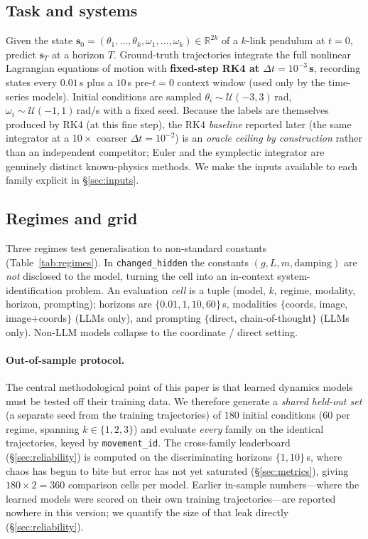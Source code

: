 \documentclass{article}
\begin{document}
\subsection{Task and systems}
Given the state $\mathbf{s}_0=(\theta_1,\dots,\theta_k,\omega_1,\dots,\omega_k)\in
\mathbb{R}^{2k}$ of a $k$-link pendulum at $t{=}0$, predict $\mathbf{s}_T$ at a
horizon $T$. Ground-truth trajectories integrate the full nonlinear Lagrangian
equations of motion with \textbf{fixed-step RK4 at $\Delta t{=}10^{-3}$\,s}, recording
states every $0.01$\,s plus a $10$\,s pre-$t{=}0$ context window (used only by the
time-series models). Initial conditions are sampled $\theta_i\sim\mathcal{U}(-3,3)$\,rad,
$\omega_i\sim\mathcal{U}(-1,1)$\,rad/s with a fixed seed. Because the labels are
themselves produced by RK4 (at this fine step), the RK4 \emph{baseline} reported later
(the same integrator at a $10{\times}$ coarser $\Delta t{=}10^{-2}$) is an \emph{oracle
ceiling by construction} rather than an independent competitor; Euler and the symplectic
integrator are genuinely distinct known-physics methods. We make the inputs available to
each family explicit in \S\ref{sec:inputs}.

\subsection{Regimes and grid}
Three regimes test generalisation to non-standard constants
(Table~\ref{tab:regimes}). In \texttt{changed\_hidden} the constants $(g,L,m,
\text{damping})$ are \emph{not} disclosed to the model, turning the cell into an
in-context system-identification problem. An evaluation \emph{cell} is a tuple
(model, $k$, regime, modality, horizon, prompting); horizons are
$\{0.01,1,10,60\}$\,s, modalities $\{$coords, image, image+coords$\}$ (LLMs only),
and prompting $\{$direct, chain-of-thought$\}$ (LLMs only). Non-LLM models collapse
to the coordinate / direct setting.

\paragraph{Out-of-sample protocol.} The central methodological point of this paper
is that learned dynamics models must be tested off their training data. We
therefore generate a \emph{shared held-out set} (a separate seed from the training
trajectories) of $180$ initial conditions ($60$ per regime, spanning
$k\in\{1,2,3\}$) and evaluate \emph{every} family on the identical trajectories,
keyed by \texttt{movement\_id}. The cross-family leaderboard
(\S\ref{sec:reliability}) is computed on the discriminating horizons
$\{1,10\}$\,s, where chaos has begun to bite but error has not yet saturated
(\S\ref{sec:metrics}), giving $180\times2=360$ comparison cells per model. Earlier
in-sample numbers---where the learned models were scored on their own training
trajectories---are reported nowhere in this version; we quantify the size of that
leak directly (\S\ref{sec:reliability}).
\end{document}
